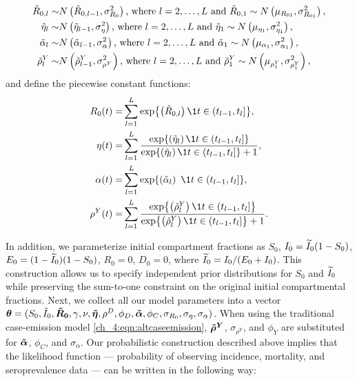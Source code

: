 \begin{equation}
\begin{aligned}
	\tilde{R}_{0,l} \sim& N\left(\tilde{R}_{0, l - 1}, \sigma_{R_0}^2\right)\text{, where } l=2,\ldots,L \text{ and } \tilde{R}_{0,1} \sim N\left(\mu_{R_{01}},\sigma^2_{R_{01}}\right),\\
	\tilde{\eta}_{l} \sim& N\left(\tilde{\eta}_{l - 1}, \sigma_\eta^2\right)\text{, where } l=2,\ldots,L \text{ and } \tilde{\eta}_1 \sim N\left(\mu_{\eta_1}, \sigma^2_{\eta_1}\right),\\
	\tilde{\alpha}_{l} \sim& N\left(\tilde{\alpha}_{l - 1}, \sigma_\alpha^2\right)\text{, where } l=2,\ldots,L \text{ and } \tilde{\alpha}_1 \sim N\left(\mu_{\alpha_1},\sigma^2_{\alpha_1}\right),\\
	\tilde{\rho}^Y_{l} \sim& N\left(\tilde{\rho}^Y_{l - 1}, \sigma_{\rho^Y}^2\right)\text{, where } l=2,\ldots,L \text{ and } \tilde{\rho}^Y_1 \sim N\left(\mu_{\rho^Y_1}, \sigma^2_{\rho^Y_1}\right),
 \label{ch_4:eqn:GMRF}
\end{aligned}
\end{equation}
and define the piecewise constant functions:
\begin{align}
	R_0(t) =& \sum_{l=1}^L \exp{\left( \tilde{R}_{0,l} \right) \1{t \in (t_{l-1}, t_l]}},\\
	\eta(t) =& \sum_{l=1}^L \frac{\exp{ \left(\etatilde_l\right) \1{t \in (t_{l-1}, t_l]} }}{\exp{\left( \etatilde_l \right) \1{t \in (t_{l-1}, t_l]}} + 1},\\
	\alpha(t) =& \sum_{l=1}^L \exp{\left( \alphatilde_l \right)\ \1{t \in (t_{l-1}, t_l]} },\\
	\rho^Y(t) =& \sum_{l=1}^L \frac{\exp{\left( \rhoytilde_l \right) \1{t \in (t_{l-1}, t_l]} }}{\exp{\left( \rhoytilde_l \right) \1{t \in (t_{l-1}, t_l]} } + 1}.
\end{align}

In addition, we parameterize initial compartment fractions as $ S_0 $, $ I_0 = \widetilde{I}_0(1 - S_0) $, $ E_0 = (1 - \widetilde{I}_0)(1 - S_0) $, $R_0 = 0$, $D_0 = 0$, where $\widetilde{I}_0 = I_0 / (E_0 + I_0)$.
This construction allows us to specify independent prior distributions for $S_0$ and $\widetilde{I}_0$ while preserving the sum-to-one constraint on the original initial compartmental fractions.
Next, we collect all our model parameters into a vector $\boldsymbol{\theta} = (S_0,  \tilde{I}_{0}, \boldsymbol{\tilde{R}_0}, \gamma, \nu, \boldsymbol{\tilde{\eta}}, \rho^D, \phi_D, \boldsymbol{\tilde{\alpha}}, \phi_C, \sigma_{R_0}, \sigma_\eta, \sigma_\alpha)$.
When using the traditional case-emission model \eqref{ch_4:eqn:altcaseemission}, $ \boldsymbol{\tilde{\rho}^Y} $,  $ \sigma_{\rho^Y} $, and $\phi_Y $ are substituted for $ \boldsymbol{\tilde{\alpha}} $, $ \phi_C $, and $ \sigma_\alpha $.
Our probabilistic construction described above implies that the likelihood function --- probability of observing incidence, mortality, and seroprevalence data --- can be written in the following way:

